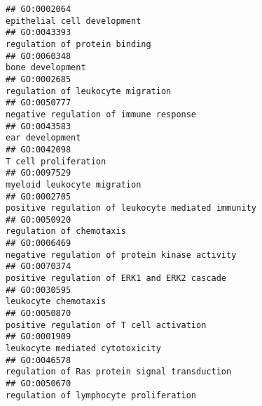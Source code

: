 \documentclass[
]{article}
\begin{document}
\begin{verbatim}
## GO:0002064                                                                                                                      epithelial cell development
## GO:0043393                                                                                                                    regulation of protein binding
## GO:0060348                                                                                                                                 bone development
## GO:0002685                                                                                                                regulation of leukocyte migration
## GO:0050777                                                                                                           negative regulation of immune response
## GO:0043583                                                                                                                                  ear development
## GO:0042098                                                                                                                             T cell proliferation
## GO:0097529                                                                                                                      myeloid leukocyte migration
## GO:0002705                                                                                               positive regulation of leukocyte mediated immunity
## GO:0050920                                                                                                                         regulation of chemotaxis
## GO:0006469                                                                                                   negative regulation of protein kinase activity
## GO:0070374                                                                                                     positive regulation of ERK1 and ERK2 cascade
## GO:0030595                                                                                                                             leukocyte chemotaxis
## GO:0050870                                                                                                         positive regulation of T cell activation
## GO:0001909                                                                                                                  leukocyte mediated cytotoxicity
## GO:0046578                                                                                                    regulation of Ras protein signal transduction
## GO:0050670                                                                                                           regulation of lymphocyte proliferation

\end{verbatim}
\end{document}
